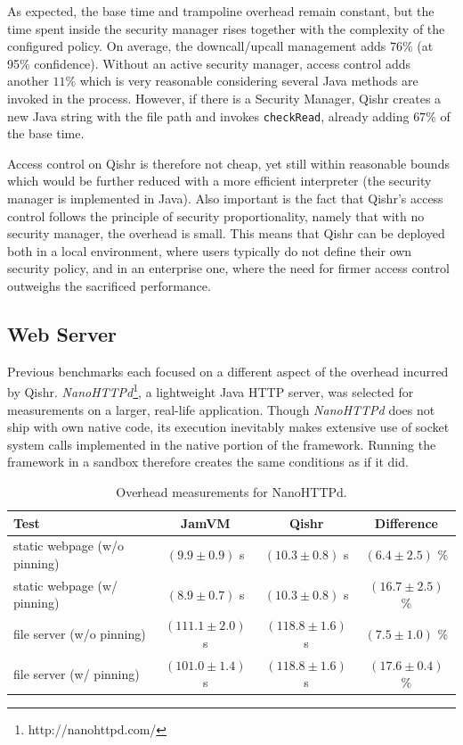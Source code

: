 \documentclass[a4paper,12pt,twoside,openright]{report}
\begin{document}
As expected, the base time and trampoline overhead remain constant, but the time spent inside the security manager rises together with the complexity of the configured policy. On average, the downcall/upcall management adds $76\%$ (at 95\% confidence). Without an active security manager, access control adds another $11\%$ which is very reasonable considering several Java methods are invoked in the process. However, if there is a Security Manager, Qishr creates a new Java string with the file path and invokes \texttt{checkRead}, already adding $67\%$ of the base time. 

Access control on Qishr is therefore not cheap, yet still within reasonable bounds which would be further reduced with a more efficient interpreter (the security manager is implemented in Java). Also important is the fact that Qishr's access control follows the principle of security proportionality, namely that with no security manager, the overhead is small. This means that Qishr can be deployed both in a local environment, where users typically do not define their own security policy, and in an enterprise one, where the need for firmer access control outweighs the sacrificed performance. 

\subsection{Web Server}

Previous benchmarks each focused on a different aspect of the overhead incurred by Qishr. \emph{NanoHTTPd}\footnote{http://nanohttpd.com/}, a lightweight Java HTTP server, was selected for measurements on a larger, real-life application. Though \emph{NanoHTTPd} does not ship with own native code, its execution inevitably makes extensive use of socket system calls implemented in the native portion of the framework. Running the framework in a sandbox therefore creates the same conditions as if it did.

\begin{table}
	\centering
	\scriptsize
	\begin{tabular}{|l|c|c|c|}
		\hline
		\bf Test			& \bf JamVM		& \bf Qishr		& \bf Difference \\
		\hline
		static webpage (w/o pinning)	& $(9.9 \pm 0.9)$ s	& $(10.3 \pm 0.8)$ s	& $(6.4 \pm 2.5)$ \% \\
		static webpage (w/ pinning)	& $(8.9 \pm 0.7)$ s	& $(10.3 \pm 0.8)$ s 	& $(16.7 \pm 2.5)$ \% \\
		file server (w/o pinning)	& $(111.1 \pm 2.0)$ s	& $(118.8 \pm 1.6)$ s 	& $(7.5 \pm 1.0)$ \% \\
		file server (w/ pinning)	& $(101.0 \pm 1.4)$ s	& $(118.8 \pm 1.6)$ s 	& $(17.6 \pm 0.4)$ \% \\
		\hline
	\end{tabular}
	\caption{Overhead measurements for NanoHTTPd.}
	\label{table:OverheadNanoHTTPd}
\end{table}
\end{document}
